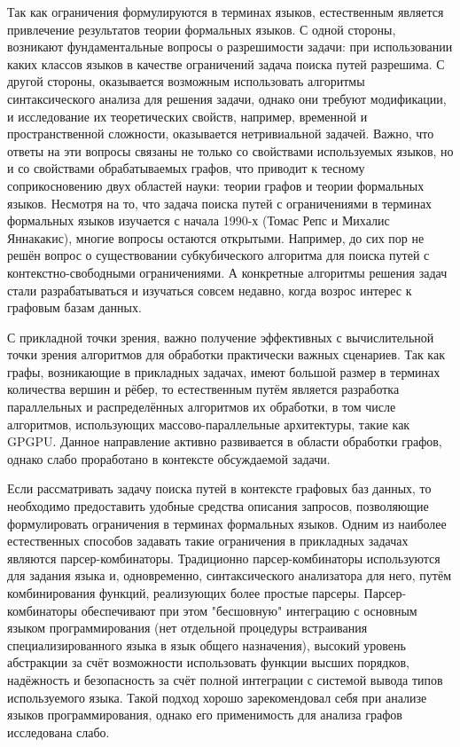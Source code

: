\documentclass[12pt]{article}  %
\theoremstyle{remark}
\begin{document}
Так как ограничения формулируются в терминах языков, естественным является привлечение результатов теории формальных языков. С одной стороны, возникают фундаментальные вопросы о разрешимости задачи: при использовании каких классов языков в качестве ограничений задача поиска путей разрешима. С другой стороны, оказывается возможным использовать алгоритмы синтаксического анализа для решения задачи, однако они требуют модификации, и исследование их теоретических свойств, например, временной и пространственной сложности, оказывается нетривиальной задачей. Важно, что ответы на эти вопросы связаны не только со свойствами используемых языков, но и со свойствами обрабатываемых графов, что приводит к тесному соприкосновению двух областей науки: теории графов и теории формальных языков. Несмотря на то, что задача поиска путей с ограничениями в терминах формальных языков изучается с начала 1990-х (Томас Репс и Михалис Яннакакис), многие вопросы остаются открытыми. Например, до сих пор не решён вопрос о существовании субкубического алгоритма для поиска путей с контекстно-свободными ограничениями. А конкретные алгоритмы решения задач стали разрабатываться и изучаться совсем недавно, когда возрос интерес к графовым базам данных.

С прикладной точки зрения, важно получение эффективных с вычислительной точки зрения алгоритмов для обработки практически важных сценариев. Так как графы, возникающие в прикладных задачах, имеют большой размер в терминах количества вершин и рёбер, то естественным путём является разработка параллельных и распределённых алгоритмов их обработки, в том числе алгоритмов, использующих массово-параллельные архитектуры, такие как GPGPU. Данное направление активно развивается в области обработки графов, однако слабо проработано в контексте обсуждаемой задачи.

Если рассматривать задачу поиска путей в контексте графовых баз данных, то необходимо предоставить удобные средства описания запросов, позволяющие формулировать ограничения в терминах формальных языков. Одним из наиболее естественных способов задавать такие ограничения в прикладных задачах являются парсер-комбинаторы. Традиционно парсер-комбинаторы используются для задания языка и, одновременно, синтаксического анализатора для него, путём комбинирования функций, реализующих более простые парсеры. Парсер-комбинаторы обеспечивают при этом "бесшовную" интеграцию с основным языком программирования (нет отдельной процедуры встраивания специализированного языка в язык общего назначения), высокий уровень абстракции за счёт возможности использовать функции высших порядков, надёжность и безопасность за счёт полной интеграции с системой вывода типов используемого языка. Такой подход хорошо зарекомендовал себя при анализе языков программирования, однако его применимость для анализа графов исследована слабо.
\end{document}
